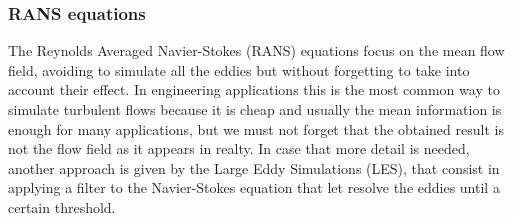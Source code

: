 \subsubsection{RANS equations}
The Reynolds Averaged Navier-Stokes (RANS) equations focus on the mean flow 
field, avoiding to simulate all the eddies but without forgetting to take into 
account their effect. In engineering applications this is the most common way 
to simulate turbulent flows because it is cheap and usually the mean 
information is enough for many applications, but we must not forget that 
the obtained result is not the flow field as it appears in realty.
In case that more detail is needed, another approach is given by the Large 
Eddy Simulations (LES), that consist in applying a filter to the Navier-Stokes 
equation that let resolve the eddies until a certain threshold.

